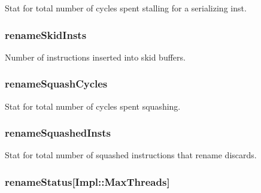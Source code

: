 \label{classDefaultRename_a712d72379bc583c374e2f6179e8ee58f}
Stat for total number of cycles spent stalling for a serializing inst. \hypertarget{classDefaultRename_a50c910ed2a23d1bbb3e7861c2d1f33f4}{
\subsubsection[{renameSkidInsts}]{ {\bf renameSkidInsts}}}
\label{classDefaultRename_a50c910ed2a23d1bbb3e7861c2d1f33f4}
Number of instructions inserted into skid buffers. \hypertarget{classDefaultRename_a8931e7bb259c1fe875fd5a88017b29e2}{
\subsubsection[{renameSquashCycles}]{ {\bf renameSquashCycles}}}
\label{classDefaultRename_a8931e7bb259c1fe875fd5a88017b29e2}
Stat for total number of cycles spent squashing. \hypertarget{classDefaultRename_ae988aa97bbfa339fc6e6bf0cbad90832}{
\subsubsection[{renameSquashedInsts}]{ {\bf renameSquashedInsts}}}
\label{classDefaultRename_ae988aa97bbfa339fc6e6bf0cbad90832}
Stat for total number of squashed instructions that rename discards. \hypertarget{classDefaultRename_a8c157bf422205d3cdd7e7c75c2592b6f}{
\subsubsection[{renameStatus}]{ {\bf renameStatus}\mbox{[}Impl::MaxThreads\mbox{]}}}
